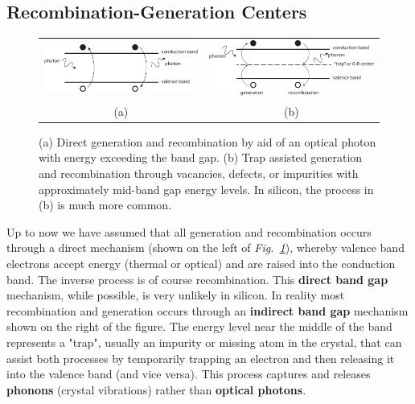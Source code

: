 \subsection{Recombination-Generation Centers}
\begin{figure}[t]
\centering
\begin{tabular}{cc}
\includegraphics[width=.45\columnwidth]{gr_direct} &
\includegraphics[width=.45\columnwidth]{gr_indirect}\\
(a) & (b)\\
\end{tabular}
\caption{(a) Direct generation and recombination by aid of an optical photon with energy exceeding the band gap.  (b) Trap assisted generation and recombination through vacancies, defects, or impurities with approximately mid-band gap energy levels.  In silicon, the process in (b) is much more common.} \label{fig:gr_direct}
\end{figure}
Up to now we have assumed that all generation and recombination occurs through a direct mechanism (shown on the left of \emph{Fig.~\ref{fig:gr_direct}}), whereby valence band electrons accept energy (thermal or optical) and are raised into the conduction band.  The inverse process is of course recombination. This \textbf{direct band gap} mechanism, while possible, is very unlikely in silicon. In reality most recombination and generation occurs through an \textbf{indirect band gap} mechanism shown on the right of the figure.  The energy level near the middle of the band represents a "trap", usually an impurity or missing atom in the crystal, that can assist both processes by temporarily trapping an electron and then releasing it into the valence band (and vice versa). This process captures and releases \textbf{phonons} (crystal vibrations) rather than \textbf{optical photons}.
